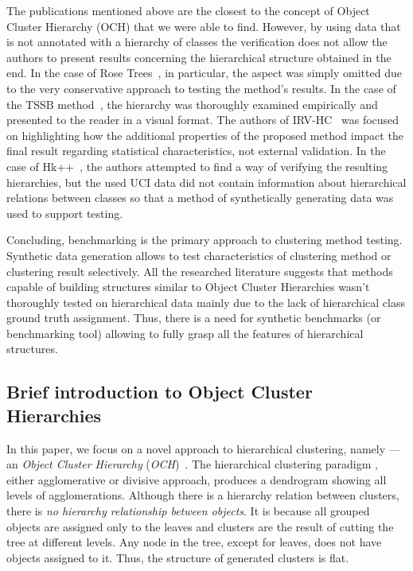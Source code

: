 \documentclass{article}
\begin{document}
The publications mentioned above are the closest to the concept of Object Cluster Hierarchy (OCH) that we were able to find. However, by using data that is not annotated with a hierarchy of classes the verification does not allow the authors to present results concerning the hierarchical structure obtained in the end. In the case of Rose Trees~\cite{2010_bayesian_rose_trees}, in particular, the aspect was simply omitted due to the very conservative approach to testing the method's results. In the case of the TSSB method~\cite{ghahramani2010tree}, the hierarchy was thoroughly examined empirically and presented to the reader in a visual format. The authors of IRV-HC~\cite{Spytkowski2012} was focused on highlighting how the additional properties of the proposed method impact the final result regarding statistical characteristics, not external validation. In the case of Hk++~\cite{Olech2016}, the authors attempted to find a way of verifying the resulting hierarchies, but the used UCI data did not contain information about hierarchical relations between classes so that a method of synthetically generating data was used to support testing.

Concluding, benchmarking is the primary approach to clustering method testing. Synthetic data generation allows to test characteristics of clustering method or clustering result selectively. All the researched literature suggests that methods capable of building structures similar to Object Cluster Hierarchies wasn't thoroughly tested on hierarchical data mainly due to the lack of hierarchical class ground truth assignment. Thus, there is a need for synthetic benchmarks (or benchmarking tool) allowing to fully grasp all the features of hierarchical structures.

\subsection{Brief introduction to Object Cluster Hierarchies}

In this paper, we focus on a novel approach to hierarchical clustering, namely --- an \textit{Object Cluster Hierarchy} (\textit{OCH})~\cite{Spytkowski2012,Olech2016}. The hierarchical clustering paradigm \cite{Dash2003109,Costa:2013,Cimiano2004,DBLP:journals/corr/abs-1105-0121}, either agglomerative or divisive approach, produces a dendrogram showing all levels of agglomerations. Although there is a hierarchy relation between clusters, there is \textit{no hierarchy relationship between objects}. It is because all grouped objects are assigned only to the leaves and clusters are the result of cutting the tree at different levels. Any node in the tree, except for leaves, does not have objects assigned to it. Thus, the structure of generated clusters is flat. 
\end{document}
